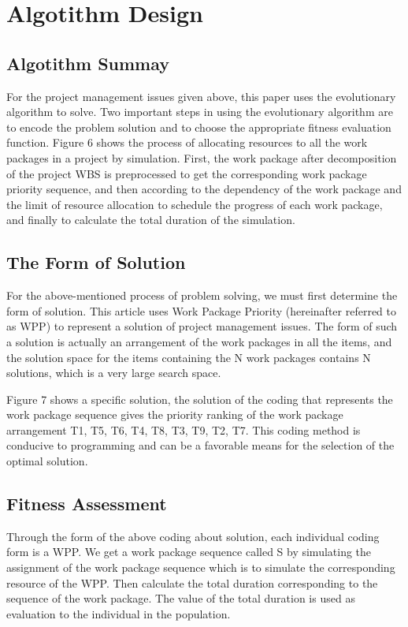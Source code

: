 \section{Algotithm Design}

\subsection{Algotithm Summay}
%
For the project management issues given above, this paper uses the
evolutionary algorithm to solve. Two important steps in using the
evolutionary algorithm are to encode the problem solution and to
choose the appropriate fitness evaluation function. Figure 6 shows the
process of allocating resources to all the work packages in a project
by simulation.  First, the work package after decomposition of the
project WBS is preprocessed to get the corresponding work package
priority sequence, and then according to the dependency of the work
package and the limit of resource allocation to schedule the progress
of each work package, and finally to calculate the total duration of
the simulation.

\subsection{The Form of Solution}
%
For the above-mentioned process of problem solving, we must first
determine the form of solution. This article uses Work Package
Priority (hereinafter referred to as WPP) to represent a solution of
project management issues. The form of such a solution is actually an
arrangement of the work packages in all the items, and the solution
space for the items containing the N work packages contains N
solutions, which is a very large search space.


Figure 7 shows a specific solution, the solution of the coding that
represents the work package sequence gives the priority ranking of the
work package arrangement T1, T5, T6, T4, T8, T3, T9, T2, T7. This
coding method is conducive to programming and can be a favorable means
for the selection of the optimal solution.


\subsection{Fitness Assessment}
%
Through the form of the above coding about solution, each individual
coding form is a WPP. We get a work package sequence called S by
simulating the assignment of the work package sequence which is to
simulate the corresponding resource of the WPP. Then calculate the
total duration corresponding to the sequence of the work package. The
value of the total duration is used as evaluation to the individual in
the population.

